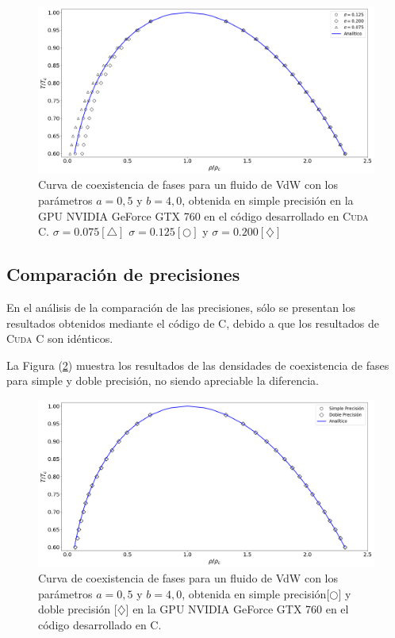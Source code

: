 \begin{figure}[h!]
	\centering
	\includegraphics[width=\textwidth]{figs/cap4/v_760_MxC_cuda_simple}
	\caption{Curva de coexistencia de fases para un fluido de VdW con los parámetros $a = 0,5 $ y $b = 4,0 $, obtenida en simple precisión en la GPU NVIDIA GeForce GTX 760 en el código desarrollado en \textsc{Cuda C}. $\sigma = 0.075[\bigtriangleup]$	 $\sigma = 0.125[\bigcirc]$ y $\sigma = 0.200[\diamondsuit]$ }
	\label{fig:v_760_MxC_cuda_simple}	
\end{figure}



\newpage
\subsection{Comparación de precisiones}

En el análisis de la comparación de las precisiones, sólo se presentan los resultados obtenidos mediante el código de \textsc{C}, debido a que los resultados de \textsc{Cuda C} son idénticos.

La Figura (\ref{fig:v_760_MxC_c_comparacion}) muestra los resultados de las densidades de coexistencia de fases para simple y doble precisión, no siendo apreciable la diferencia.

\begin{figure}[htbp]
	\centering
	\includegraphics[width=\textwidth]{figs/cap4/v_760_MxC_c_comparacion}
	\caption{Curva de coexistencia de fases para un fluido de VdW con los parámetros $a = 0,5 $ y $b = 4,0 $, obtenida en simple precisión[$\bigcirc$] y doble precisión [$\diamondsuit$] en la GPU NVIDIA GeForce GTX 760 en el código desarrollado en \textsc{C}.} 
	\label{fig:v_760_MxC_c_comparacion}	
\end{figure}


